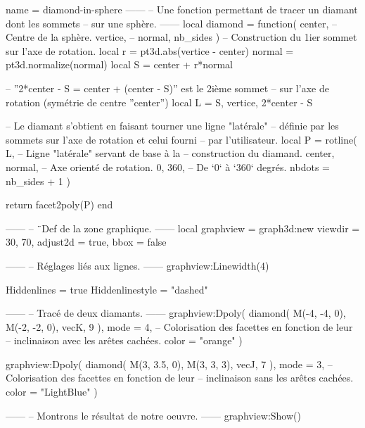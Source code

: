 \documentclass[border = 3pt]{standalone}
\begin{document}
\begin{luadraw*}{name = diamond-in-sphere}
------
-- Une fonction permettant de tracer un diamant dont les sommets
-- sur une sphère.
------
local diamond = function(
  center,   -- Centre de la sphère.
  vertice,  --
  normal,
  nb_sides
)
-- Construction du 1ier sommet sur l'axe de rotation.
  local r = pt3d.abs(vertice - center)
  normal  = pt3d.normalize(normal)
  local S = center + r*normal

-- ''2*center - S = center + (center - S)'' est le 2ième sommet
-- sur l'axe de rotation (symétrie de centre ''center'')
  local L = {S, vertice, 2*center - S}

-- Le diamant s'obtient en faisant tourner une ligne "latérale"
-- définie par les sommets sur l'axe de rotation et celui fourni
-- par l'utilisateur.
  local P = rotline(
    L,                 -- Ligne "latérale" servant de base à la
                       -- construction du diamand.
    {center, normal},  -- Axe orienté de rotation.
    0, 360,            -- De `0` à `360` degrés.
    {nbdots = nb_sides + 1}
  )

  return facet2poly(P)
end

------
-- ¨Def de la zone graphique.
------
local graphview = graph3d:new{
  viewdir  = {30, 70},
  adjust2d = true,
  bbox     = false
}

------
-- Réglages liés aux lignes.
------
graphview:Linewidth(4)

Hiddenlines     = true
Hiddenlinestyle = "dashed"

------
-- Tracé de deux diamants.
------
graphview:Dpoly(
  diamond(
    M(-4, -4, 0), M(-2, -2, 0), vecK,
    9
  ),
  {
    mode  = 4,  -- Colorisation des facettes en fonction de leur
                -- inclinaison avec les arêtes cachées.
    color = "orange"
  }
)

graphview:Dpoly(
  diamond(
    M(3, 3.5, 0), M(3, 3, 3), vecJ,
    7
  ),
  {
    mode  = 3,  -- Colorisation des facettes en fonction de leur
                -- inclinaison sans les arêtes cachées.
    color = "LightBlue"
  }
)

------
-- Montrons le résultat de notre oeuvre.
------
graphview:Show()
\end{luadraw*}
\end{document}

